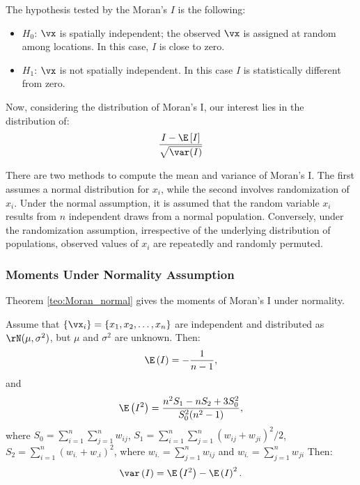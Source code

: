 \documentclass[english,12pt]{book}\usepackage[]{graphicx}\usepackage[]{xcolor}
\begin{document}
The hypothesis tested by the Moran's $I$ is the following:
\begin{itemize}
  \item $H_0$: $\vx$ is spatially independent; the observed $\vx$ is assigned at random among locations. In this case, $I$ is close to zero.
  \item $H_1$: $\vx$ is not spatially independent. In this case $I$ is statistically different from zero. 
\end{itemize}

Now, considering the distribution of Moran's I, our interest lies in the distribution of:
\begin{equation*}
  \frac{I - \E\left[I\right]}{\sqrt{\var(I)}}
\end{equation*}

There are two methods to compute the mean and variance of Moran's I. The first assumes a normal distribution for $x_i$, while the second involves randomization of $x_i$. Under the normal assumption, it is assumed that the random variable $x_i$ results from $n$ independent draws from a normal population. Conversely, under the randomization assumption, irrespective of the underlying distribution of populations, observed values of $x_i$ are repeatedly and randomly permuted.

\subsubsection{Moments Under Normality Assumption}

Theorem \ref{teo:Moran_normal} gives the moments of Moran's I under normality. 

\begin{theorem}\label{teo:Moran_normal}
Assume that $\left\lbrace \vx_i\right\rbrace = \left\lbrace x_1, x_2,\ldots, x_n\right\rbrace$ are independent and distributed as $\rN(\mu, \sigma^2)$, but $\mu$ and $\sigma^2$ are unknown. Then:
\begin{equation*}
\E\left(I\right) = - \frac{1}{n - 1}, 
\end{equation*}
%
and
\begin{equation*}
\E\left(I^2\right) = \frac{n^2S_1 - nS_2 + 3S_0^2}{S_0^2(n^2 - 1)},
\end{equation*}
%
where $S_0=\sum_{i = 1}^n\sum_{j=1}^nw_{ij}$, $S_1= \sum_{i = 1}^n\sum_{j = 1}^n(w_{ij} + w_{ji})^2/2$, $S_2 = \sum_{i = 1}^n(w_{i.} + w_{.i})^2$, where $w_{i.}= \sum_{j = 1}^nw_{ij}$ and $w_{i.}=\sum_{j = 1}^nw_{ji}$
Then:
\begin{equation*}
\var\left(I\right)=\E\left(I^2\right) - \E\left(I\right)^2.
\end{equation*}
\end{theorem}
\end{document}

